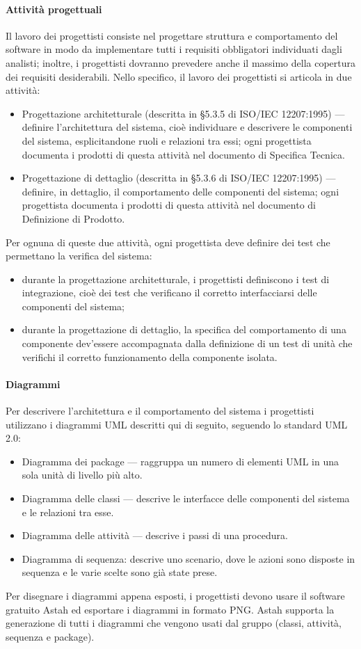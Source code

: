 	\paragraph{Attività progettuali} Il lavoro dei progettisti consiste nel progettare
struttura e comportamento del software in modo da implementare tutti i requisiti
obbligatori individuati dagli analisti; inoltre, i progettisti dovranno prevedere
anche il massimo della copertura dei requisiti desiderabili. Nello specifico, il lavoro dei progettisti si articola in due
attività:
\begin{itemize}
\item Progettazione architetturale (descritta in §5.3.5 di ISO/IEC 12207:1995)
— definire l’architettura del sistema, cioè individuare e descrivere le componenti
del sistema, esplicitandone ruoli e relazioni tra essi; ogni progettista
documenta i prodotti di questa attività nel documento di Specifica Tecnica.
\item Progettazione di dettaglio (descritta in §5.3.6 di ISO/IEC 12207:1995)
— definire, in dettaglio, il comportamento delle componenti del sistema;
ogni progettista documenta i prodotti di questa attività nel documento di
Definizione di Prodotto.
\end{itemize}
Per ognuna di queste due attività, ogni progettista deve definire dei test che
permettano la verifica del sistema:
\begin{itemize}
\item durante la progettazione architetturale, i progettisti definiscono i test di
integrazione, cioè dei test che verificano il corretto interfacciarsi delle
componenti del sistema;
\item durante la progettazione di dettaglio, la specifica del comportamento di
una componente dev’essere accompagnata dalla definizione di un test di
unità che verifichi il corretto funzionamento della componente isolata.

\end{itemize}
\paragraph{Diagrammi} Per descrivere l’architettura e il comportamento del
sistema i progettisti utilizzano i diagrammi UML descritti qui di seguito, seguendo
lo standard UML 2.0:
\begin{itemize}
\item Diagramma dei package — raggruppa un numero di elementi UML in
una sola unità di livello più alto.
\item Diagramma delle classi — descrive le interfacce delle componenti del
sistema e le relazioni tra esse.
\item Diagramma delle attività — descrive i passi di una procedura.
\item Diagramma di sequenza: descrive uno scenario, dove le azioni sono disposte
in sequenza e le varie scelte sono già state prese.
\end{itemize}
Per disegnare i diagrammi appena esposti, i progettisti devono usare il software
gratuito Astah ed esportare i diagrammi in formato PNG. Astah supporta la
generazione di tutti i diagrammi che vengono usati dal gruppo (classi, attività,
sequenza e package).

